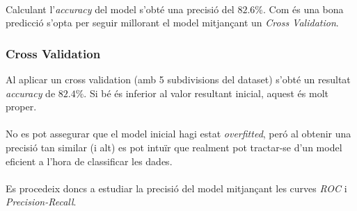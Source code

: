 \documentclass[a4paper, 11pt]{article}
\begin{document}
\\
Calculant l'\textit{accuracy} del model s'obté una precisió del $82.6\%$. Com és una bona predicció s'opta per seguir millorant el model mitjançant un \textit{Cross Validation}.


\subsubsection{Cross Validation}
Al aplicar un cross validation (amb 5 subdivisions del dataset) s’obté un resultat \textit{accuracy}
de $82.4\%$. Si bé és inferior al valor resultant inicial, aquest és molt proper.\\\\ 
No es pot assegurar que el model inicial hagi estat \textit{overfitted}, peró al obtenir una precisió tan similar (i alt) es pot intuïr que realment pot tractar-se d'un model eficient a l'hora de classificar les dades.\\\\
Es procedeix doncs a estudiar la precisió del model mitjançant les curves \textit{ROC} i \textit{Precision-Recall}.
\newpage
\end{document}
